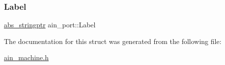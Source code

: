 \mbox{\label{structain__port_ac2269d031ae51cd227f87391fba81b1a}} 
\subsubsection{\texorpdfstring{Label}{Label}}
{\footnotesize\ttfamily \hyperlink{structabs__stringptr}{abs\+\_\+stringptr} ain\+\_\+port\+::\+Label}



The documentation for this struct was generated from the following file\+:\begin{DoxyCompactItemize}
\item 
\hyperlink{ain__machine_8h}{ain\+\_\+machine.\+h}\end{DoxyCompactItemize}
